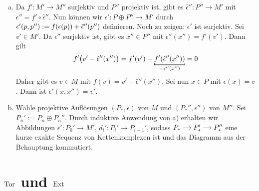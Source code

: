 \begin{beweis}
	\leavevmode
	\begin{enumerate}[a)]
		\item Da $f' \colon M' \to M''$ surjektiv und $P''$ projektiv ist, gibt es $\hat{\epsilon}'' \colon P'' \to M'$ mit $\epsilon'' = f' \circ \hat{\epsilon}''$.
		Nun können wir $\epsilon' \colon P \oplus P'' \to M'$ durch $\epsilon' (p,p'') := f \enbrace*{\epsilon(p)} + \hat{\epsilon}''(p'')$ definieren.
		Noch zu zeigen: $\epsilon'$ ist surjektiv. 
		Sei $v' \in M'$. Da $\epsilon''$ surjektiv ist, gibt es $x'' \in P''$ mit $\epsilon''(x'')=f'(v')$. Dann gilt
		\[
			f'\enbrace[\big]{v' - \hat{\epsilon}''(x'')} = f'(v') - \Underbracket{f' \enbrace*{\hat{\epsilon}''(x'')}}{=\epsilon''(x'')} = 0
		\]
		Daher gibt es $v \in M$ mit $f(v)=v' - \hat{\epsilon}''(x'')$.
		Sei nun $x \in P$ mit $\epsilon(x)=v$.
		Dann ist $\epsilon'(x,x'')=v'$.
		\item Wähle projektive Auflösungen $(P_*,\epsilon)$ von $M$ und $(P_*'',\epsilon'')$ von $M''$.
		Sei $P_n' := P_n \oplus P_n''$.
		Durch induktive Anwendung von a) erhalten wir Abbildungen $\epsilon' \colon P_0' \to M'$, $d_i' \colon P_i' \to P_{i-1}'$, sodass $\begin{tikzcd}[cramped,sep=small]
			P_* \rar & P_*' \rar & P_*''
		\end{tikzcd}$ eine kurze exakte Sequenz von Kettenkomplexen ist und das Diagramm aus der Behauptung kommutiert.\qedhere
	\end{enumerate}
\end{beweis}
\newpage

\section[Tor und Ext]{$\operatorname{Tor}$ und $\operatorname{Ext}$} %
\label{sec:12}

